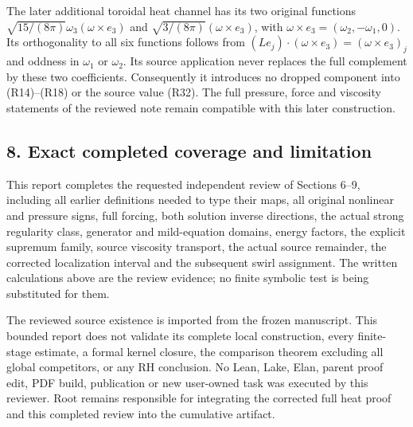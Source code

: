 The later additional toroidal heat channel has its two original functions \(\sqrt{15/(8\pi)}\omega_3(\omega\times e_3)\) and \(\sqrt{3/(8\pi)}(\omega\times e_3)\), with \(\omega\times e_3=(\omega_2,-\omega_1,0)\). Its orthogonality to all six functions follows from \((Le_j)\cdot(\omega\times e_3)=(\omega\times e_3)_j\) and oddness in \(\omega_1\) or \(\omega_2\). Its source application never replaces the full complement by these two coefficients. Consequently it introduces no dropped component into (R14)--(R18) or the source value (R32). The full pressure, force and viscosity statements of the reviewed note remain compatible with this later construction.

\subsection*{8. Exact completed coverage and limitation}

This report completes the requested independent review of Sections 6--9, including all earlier definitions needed to type their maps, all original nonlinear and pressure signs, full forcing, both solution inverse directions, the actual strong regularity class, generator and mild-equation domains, energy factors, the explicit supremum family, source viscosity transport, the actual source remainder, the corrected localization interval and the subsequent swirl assignment. The written calculations above are the review evidence; no finite symbolic test is being substituted for them.

The reviewed source existence is imported from the frozen manuscript. This bounded report does not validate its complete local construction, every finite-stage estimate, a formal kernel closure, the comparison theorem excluding all global competitors, or any RH conclusion. No Lean, Lake, Elan, parent proof edit, PDF build, publication or new user-owned task was executed by this reviewer. Root remains responsible for integrating the corrected full heat proof and this completed review into the cumulative artifact.

